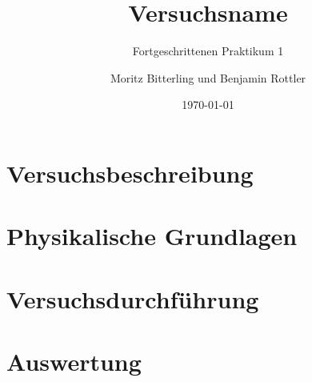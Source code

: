 \documentclass[12pt, a4paper]{scrartcl}
\title{Versuchsname}
\subtitle{Fortgeschrittenen Praktikum 1}
\author{Moritz Bitterling und Benjamin Rottler}
\date{\today}
\numberwithin{equation}{section}
\begin{document}
\maketitle

\newpage

\tableofcontents

\newpage

\section{Versuchsbeschreibung}

\section{Physikalische Grundlagen}

\section{Versuchsdurchführung}

\section{Auswertung}
\end{document}
